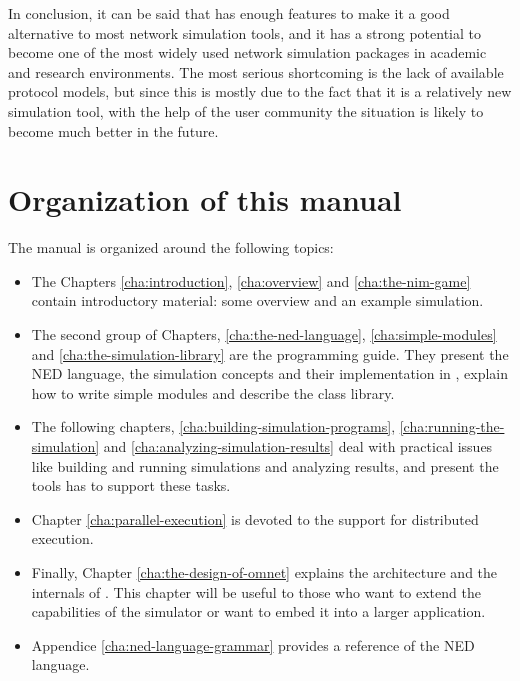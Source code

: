In conclusion, it can be said that {\opp} has enough features
to make it a good alternative to most network simulation tools,
and it has a strong potential to become one of the most widely
used network simulation packages in academic and research environments.
The most serious shortcoming is the lack of available protocol
models, but since this is mostly due to the fact that it is a
relatively new simulation tool, with the help of the {\opp}
user community the situation is likely to become much better
in the future.





\section{Organization of this manual}

The manual is organized around the following topics:
\begin{itemize}
  \item{The Chapters \ref{cha:introduction}, \ref{cha:overview} and
    \ref{cha:the-nim-game} contain introductory material: some
    overview and an example simulation.}
  \item{The second group of Chapters, \ref{cha:the-ned-language},
    \ref{cha:simple-modules} and \ref{cha:the-simulation-library} are
    the programming guide. They present the NED language, the
    simulation concepts and their implementation in {\opp}, explain
    how to write simple modules and describe the class library.}
  \item{The following chapters,
    \ref{cha:building-simulation-programs},
    \ref{cha:running-the-simulation} and
    \ref{cha:analyzing-simulation-results} deal with practical issues
    like building and running simulations and analyzing results, and
    present the tools {\opp} has to support these tasks.}
  \item{Chapter \ref{cha:parallel-execution} is devoted to the support
    for distributed execution.}
  \item{Finally, Chapter \ref{cha:the-design-of-omnet} explains the
    architecture and the internals of {\opp}. This chapter will be
    useful to those who want to extend the capabilities of the
    simulator or want to embed it into a larger application.}
  \item{Appendice \ref{cha:ned-language-grammar} provides a reference
    of the NED language.}
\end{itemize}




